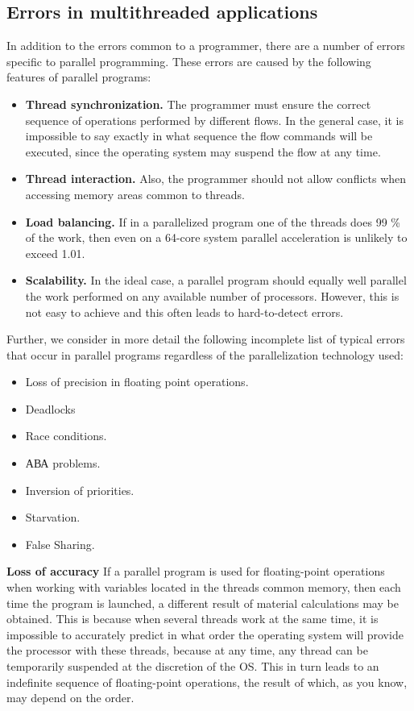 { %
	\subsection{Errors in multithreaded applications}
	\par In addition to the errors common to a programmer, there are a number of errors specific to parallel programming. These errors are caused by the following features of parallel programs:
	\begin{itemize}
		\item\textbf{Thread synchronization.} The programmer must ensure the correct sequence of operations performed by different flows. In the general case, it is impossible to say exactly in what sequence the flow commands will be executed, since the operating system may suspend the flow at any time.
		\item\textbf{Thread interaction.} Also, the programmer should not allow conflicts when accessing memory areas common to threads.
		\item\textbf{Load balancing.} If in a parallelized program one of the threads does 99 \% of the work, then even on a 64-core system parallel acceleration is unlikely to exceed 1.01.
		\item\textbf{Scalability.} In the ideal case, a parallel program should equally well parallel the work performed on any available number of processors. However, this is not easy to achieve and this often leads to hard-to-detect errors.
	\end{itemize}
	\par Further, we consider in more detail the following incomplete list of typical errors that occur in parallel programs regardless of the parallelization technology used:
	\begin{itemize}
		\item Loss of precision in floating point operations.
		\item Deadlocks
		\item Race conditions.
		\item АВА problems.
		\item Inversion of priorities.
		\item Starvation.
		\item False Sharing.
	\end{itemize}
	\par\textbf{Loss of accuracy} If a parallel program is used for floating-point operations when working with variables located in the threads common memory, then each time the program is launched, a different result of material calculations may be obtained. This is because when several threads work at the same time, it is impossible to accurately predict in what order the operating system will provide the processor with these threads, because at any time, any thread can be temporarily suspended at the discretion of the OS. This in turn leads to an indefinite sequence of floating-point operations, the result of which, as you know, may depend on the order.
}
